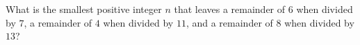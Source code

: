 What is the smallest positive integer $n$ that leaves a remainder of $6$ when divided by $7$, a remainder of $4$ when divided by $11$, and a remainder of $8$ when divided by $13$?
